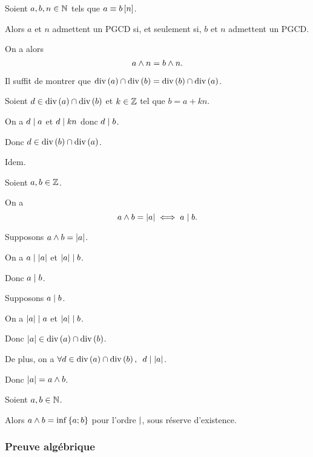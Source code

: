 \begin{lem}
Soient \(a,b,n\in\mathbb{N}\) tels que \(a\equiv b\left[n\right]\).

Alors \(a\) et \(n\) admettent un PGCD si, et seulement si, \(b\) et \(n\) admettent un PGCD.

On a alors \[a\land n=b\land n.\]
\end{lem}

\begin{dem}
Il suffit de montrer que \(\operatorname{div}\left(a\right)\cap\operatorname{div}\left(b\right)=\operatorname{div}\left(b\right)\cap\operatorname{div}\left(a\right)\).

\incdir

Soient \(d\in\operatorname{div}\left(a\right)\cap\operatorname{div}\left(b\right)\) et \(k\in\mathbb{Z}\) tel que \(b=a+kn\).

On a \(d\mid a\) et \(d\mid kn\) donc \(d\mid b\).

Donc \(d\in\operatorname{div}\left(b\right)\cap\operatorname{div}\left(a\right)\).

\increc Idem.
\end{dem}

\begin{rem}
Soient \(a,b\in\mathbb{Z}\).

On a \[a\land b=\left\lvert a\right\rvert\iff a\mid b.\]
\end{rem}

\begin{dem}
\impdir

Supposons \(a\land b=\left\lvert a\right\rvert\).

On a \(a\mid\left\lvert a\right\rvert\) et \(\left\lvert a\right\rvert\mid b\).

Donc \(a\mid b\).

\imprec

Supposons \(a\mid b\).

On a \(\left\lvert a\right\rvert\mid a\) et \(\left\lvert a\right\rvert\mid b\).

Donc \(\left\lvert a\right\rvert\in\operatorname{div}\left(a\right)\cap\operatorname{div}\left(b\right)\).

De plus, on a \(\quantifs{\forall d\in\ensdiv{a}\inter\ensdiv{b}}d\divise\abs{a}\).

Donc \(\left\lvert a\right\rvert=a\land b\).
\end{dem}

\begin{rem}
Soient \(a,b\in\mathbb{N}\).

Alors \(a\land b=\inf\left\lbrace a;b\right\rbrace\) pour l'ordre \(\mid\), sous réserve d'existence.
\end{rem}

\subsubsection{Preuve algébrique}

